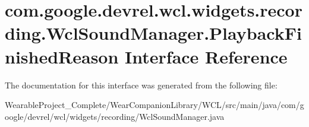\hypertarget{interfacecom_1_1google_1_1devrel_1_1wcl_1_1widgets_1_1recording_1_1WclSoundManager_1_1PlaybackFinishedReason}{}\section{com.\+google.\+devrel.\+wcl.\+widgets.\+recording.\+Wcl\+Sound\+Manager.\+Playback\+Finished\+Reason Interface Reference}
\label{interfacecom_1_1google_1_1devrel_1_1wcl_1_1widgets_1_1recording_1_1WclSoundManager_1_1PlaybackFinishedReason}


The documentation for this interface was generated from the following file\+:\begin{DoxyCompactItemize}
\item 
Wearable\+Project\+\_\+\+Complete/\+Wear\+Companion\+Library/\+W\+C\+L/src/main/java/com/google/devrel/wcl/widgets/recording/Wcl\+Sound\+Manager.\+java\end{DoxyCompactItemize}
